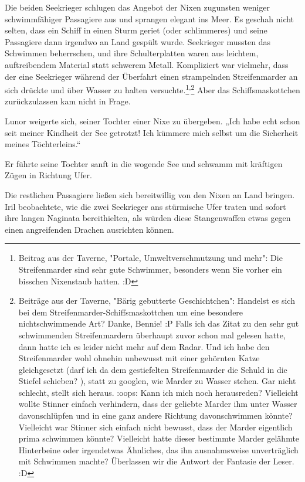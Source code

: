Die beiden Seekrieger schlugen das Angebot der Nixen zugunsten weniger schwimmfähiger Passagiere aus und sprangen elegant ins Meer. Es geschah nicht selten, dass ein Schiff in einen Sturm geriet (oder schlimmeres) und seine Passagiere dann irgendwo an Land gespült wurde. Seekrieger mussten das Schwimmen beherrschen, und ihre Schulterplatten waren aus leichtem, auftreibendem Material statt schwerem Metall. Kompliziert war vielmehr, dass der eine Seekrieger während der Überfahrt einen strampelnden Streifenmarder an sich drückte und über Wasser zu halten versuchte.\footnote{Beitrag aus der Taverne, "Portale, Umweltverschmutzung und mehr":  Die Streifenmarder sind sehr gute Schwimmer, besonders wenn Sie vorher ein bisschen Nixenstaub hatten. :D}\textsuperscript{,}\footnote{Beiträge aus der Taverne, "Bärig gebutterte Geschichtchen": \newline [Bennie:] Handelst es sich bei dem Streifenmarder-Schiffsmaskottchen um eine besondere nichtschwimmende Art? \newline [Butterbrotbär:] Danke, Bennie! :P Falls ich das Zitat zu den sehr gut schwimmenden Streifenmardern überhaupt zuvor schon mal gelesen hatte, dann hatte ich es leider nicht mehr auf dem Radar. Und ich habe den Streifenmarder wohl ohnehin unbewusst mit einer gehörnten Katze gleichgesetzt (darf ich da dem gestiefelten Streifenmarder die Schuld in die Stiefel schieben? ), statt zu googlen, wie Marder zu Wasser stehen. Gar nicht schlecht, stellt sich heraus. :oops: Kann ich mich noch herausreden? Vielleicht wollte Stinner einfach verhindern, dass der geliebte Marder ihm unter Wasser davonschlüpfen und in eine ganz andere Richtung davonschwimmen könnte? Vielleicht war Stinner sich einfach nicht bewusst, dass der Marder eigentlich prima schwimmen könnte? Vielleicht hatte dieser bestimmte Marder gelähmte Hinterbeine oder irgendetwas Ähnliches, das ihn ausnahmsweise unverträglich mit Schwimmen machte? Überlassen wir die Antwort der Fantasie der Leser. :D}
Aber das Schiffsmaskottchen zurückzulassen kam nicht in Frage.

Lunor weigerte sich, seiner Tochter einer Nixe zu übergeben. „Ich habe echt schon seit meiner Kindheit der See getrotzt! Ich kümmere mich selbst um die Sicherheit meines Töchterleins.“

Er führte seine Tochter sanft in die wogende See und schwamm mit kräftigen Zügen in Richtung Ufer.

Die restlichen Passagiere ließen sich bereitwillig von den Nixen an Land bringen. Iril beobachtete, wie die zwei Seekrieger ans stürmische Ufer traten und sofort ihre langen Naginata bereithielten, als würden diese Stangenwaffen etwas gegen einen angreifenden Drachen ausrichten können.

